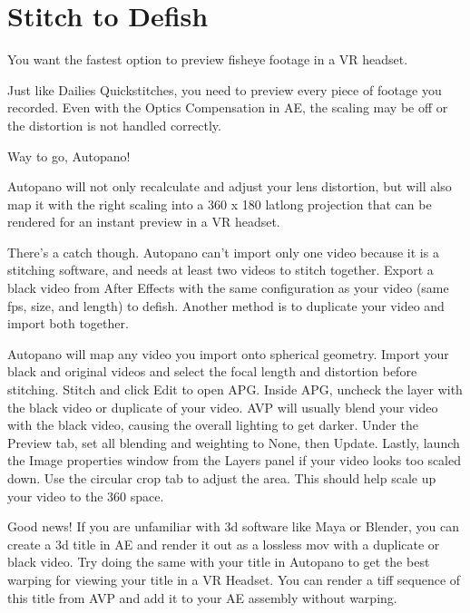 \chapter{Stitch to Defish}
\pagecolor{white}
\label{chap:52}
\begin{fullwidth}

\problem

{\large You want the fastest option to preview fisheye footage in a VR headset. \par}

Just like Dailies Quickstitches, you need to preview every piece of footage you recorded. Even with the Optics Compensation in AE, the scaling may be off or the distortion is not handled correctly.

\solution

{\large Way to go, Autopano! \par}

Autopano will not only recalculate and adjust your lens distortion, but will also map it with the right scaling into a 360 x 180 latlong projection that can be rendered for an instant preview in a VR headset.

There’s a catch though. Autopano can’t import only one video because it is a stitching software, and needs at least two videos to stitch together. Export a black video from After Effects with the same configuration as your video (same fps, size, and length) to defish. Another method is to duplicate your video and import both together.


Autopano will map any video you import onto spherical geometry. Import your black and original videos and select the focal length and distortion before stitching. Stitch and click Edit to open APG. Inside APG, uncheck the layer with the black video or duplicate of your video. AVP will usually blend your video with the black video, causing the overall lighting to get darker. Under the Preview tab, set all blending and weighting to None, then Update. Lastly, launch the Image properties window from the Layers panel if your video looks too scaled down. Use the circular crop tab to adjust the area. This should help scale up your video to the 360 space.




Good news! If you are unfamiliar with 3d software like Maya or Blender, you can create a 3d title in AE and render it out as a lossless mov with a duplicate or black video. Try doing the same with your title in Autopano to get the best warping for viewing your title in a VR Headset. You can render a tiff sequence of this title from AVP and add it to your AE assembly without warping.


\clearpage
\end{fullwidth}